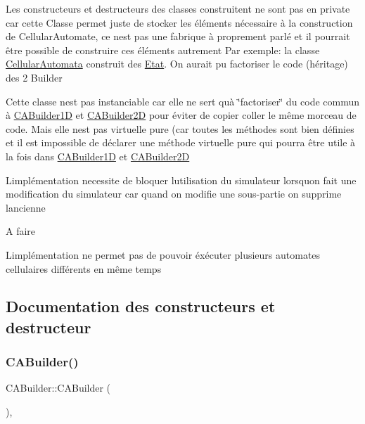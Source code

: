 Les constructeurs et destructeurs des classes construitent ne sont pas en private car cette Classe permet juste de stocker les éléments nécessaire à la construction de Cellular\+Automate, ce n\textquotesingle{}est pas une fabrique à proprement parlé et il pourrait être possible de construire ces éléments autrement Par exemple\+: la classe \mbox{\hyperlink{class_cellular_automata}{Cellular\+Automata}} construit des \mbox{\hyperlink{class_etat}{Etat}}. On aurait pu factoriser le code (héritage) des 2 Builder

Cette classe n\textquotesingle{}est pas instanciable car elle ne sert qu\textquotesingle{}à \char`\"{}factoriser\char`\"{} du code commun à \mbox{\hyperlink{class_c_a_builder1_d}{C\+A\+Builder1D}} et \mbox{\hyperlink{class_c_a_builder2_d}{C\+A\+Builder2D}} pour éviter de copier coller le même morceau de code. Mais elle n\textquotesingle{}est pas virtuelle pure (car toutes les méthodes sont bien définies et il est impossible de déclarer une méthode virtuelle pure qui pourra être utile à la fois dans \mbox{\hyperlink{class_c_a_builder1_d}{C\+A\+Builder1D}} et \mbox{\hyperlink{class_c_a_builder2_d}{C\+A\+Builder2D}}

L\textquotesingle{}implémentation necessite de bloquer l\textquotesingle{}utilisation du simulateur lorsqu\textquotesingle{}on fait une modification du simulateur car quand on modifie une sous-\/partie on supprime l\textquotesingle{}ancienne

\begin{DoxyRefDesc}{A faire}
\item[\mbox{\hyperlink{todo__todo000001}{A faire}}]L\textquotesingle{}implémentation ne permet pas de pouvoir éxécuter plusieurs automates cellulaires différents en même temps \end{DoxyRefDesc}


\subsection{Documentation des constructeurs et destructeur}
\mbox{\label{class_c_a_builder_a83d89eba527bee907d22d657fab5fbf6}} 
\subsubsection{\texorpdfstring{C\+A\+Builder()}{CABuilder()}\hspace{0.1cm}{\footnotesize\ttfamily [1/2]}}
{\footnotesize\ttfamily C\+A\+Builder\+::\+C\+A\+Builder (\begin{DoxyParamCaption}{ }\end{DoxyParamCaption})\hspace{0.3cm}{\ttfamily [inline]}, {\ttfamily [protected]}}

